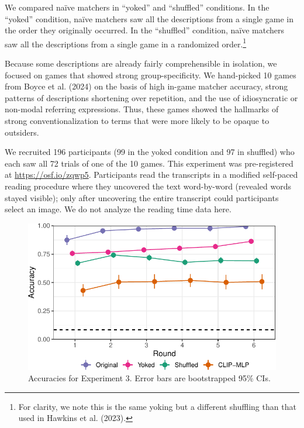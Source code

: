 \documentclass[10pt, letterpaper]{article}
\begin{document}
We compared naïve matchers in ``yoked'' and ``shuffled'' conditions. In
the ``yoked'' condition, naïve matchers saw all the descriptions from a
single game in the order they originally occurred. In the ``shuffled''
condition, naïve matchers saw all the descriptions from a single game in
a randomized order.\footnote{For clarity, we note this is the same
  yoking but a different shuffling than that used in Hawkins et al.
  (2023).}

Because some descriptions are already fairly comprehensible in
isolation, we focused on games that showed strong group-specificity. We
hand-picked 10 games from Boyce et al. (2024) on the basis of high
in-game matcher accuracy, strong patterns of descriptions shortening
over repetition, and the use of idiosyncratic or non-modal referring
expressions. Thus, these games showed the hallmarks of strong
conventionalization to terms that were more likely to be opaque to
outsiders.

We recruited 196 participants (99 in the yoked condition and 97 in
shuffled) who each saw all 72 trials of one of the 10 games. This
experiment was pre-registered at \url{https://osf.io/zqwp5}.
Participants read the transcripts in a modified self-paced reading
procedure where they uncovered the text word-by-word (revealed words
stayed visible); only after uncovering the entire transcript could
participants select an image. We do not analyze the reading time data
here.

\begin{CodeChunk}
\begin{figure}[t]

{\centering \includegraphics[width=0.9\linewidth]{figs/fig-yoked-1} 

}

\caption[Accuracies for Experiment 3]{Accuracies for Experiment 3. Error bars are bootstrapped 95\% CIs. \label{yoked}}\label{fig:fig-yoked}
\end{figure}
\end{CodeChunk}
\end{document}
